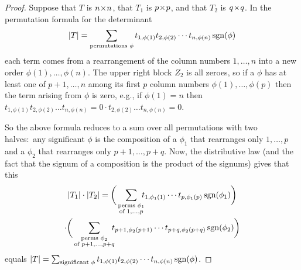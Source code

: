 \begin{proof}
Suppose that \( T \) is \( n \! \times \! n \),
that \( T_1 \) is \( p \! \times \! p \),
and that \( T_2 \) is \( q \! \times \! q \).
In the permutation formula for the determinant
\begin{equation*}
  \deter{T}=
  \sum_{\text{\scriptsize permutations\ }\phi}
          t_{1,\phi(1)}t_{2,\phi(2)}\cdots t_{n,\phi(n)}\sgn(\phi)
\end{equation*}
each term comes from a rearrangement of the column numbers
\( 1,\dots,n \) into a new order \( \phi(1),\dots,\phi(n) \).
The upper right block $Z_2$ is all zeroes, so if a
\( \phi \) has at least one of \( p+1,\dots,n \) among its first
\( p \) column numbers \( \phi(1),\dots,\phi(p) \) then the term arising
from \( \phi \) is zero,
e.g., if \( \phi(1)=n \) then
\( t_{1,\phi(1)}t_{2,\phi(2)}\dots t_{n,\phi(n)}
   =0\cdot t_{2,\phi(2)}\dots t_{n,\phi(n)}=0 \).

So the above formula reduces to a sum over all permutations with 
two halves:~any significant $\phi$ is the composition of a $\phi_1$ that
rearranges only \( 1,\dots,p \) 
and a $\phi_2$ that rearranges only \( p+1,\dots,p+q \).
Now, the distributive law 
(and the fact that the signum of a composition is the product
of the signums) gives that this
\begin{multline*}
   \deter{T_1}\cdot\deter{T_2}=
   \bigg(\sum_{\begin{subarray}{c}
                \text{\scriptsize perms\ }\phi_1 \\
                \text{\scriptsize of\ } 1,\dots,p
               \end{subarray}}
       \!\!\! t_{1,\phi_1(1)}\cdots t_{p,\phi_1(p)}\sgn(\phi_1) \bigg)  \\
   \cdot
   \bigg(\sum_{\begin{subarray}{c}
                \text{\scriptsize perms\ }\phi_2 \\
                \text{\scriptsize of\ } p+1,\dots,p+q
               \end{subarray}}
       \!\!\! t_{p+1,\phi_2(p+1)}\cdots t_{p+q,\phi_2(p+q)}\sgn(\phi_2) 
        \bigg)
\end{multline*}
equals
  $\deter{T}=
  \sum_{\text{\scriptsize significant\ }\phi}
          t_{1,\phi(1)}t_{2,\phi(2)}\cdots t_{n,\phi(n)}\sgn(\phi)$.
\end{proof}

